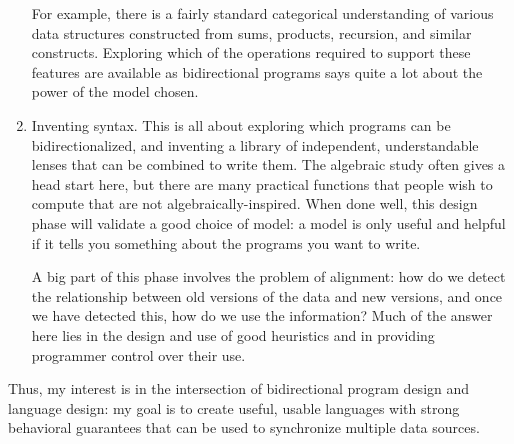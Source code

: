 \documentclass{article}
\begin{document}
\begin{enumerate}
        For example, there is a fairly standard categorical understanding of
        various data structures constructed from sums, products, recursion,
        and similar constructs. Exploring which of the operations required
        to support these features are available as bidirectional programs
        says quite a lot about the power of the model chosen.
    \item Inventing syntax. This is all about exploring which programs can
        be bidirectionalized, and inventing a library of independent,
        understandable lenses that can be combined to write them. The
        algebraic study often gives a head start here, but there are many
        practical functions that people wish to compute that are not
        algebraically-inspired. When done well, this design phase will
        validate a good choice of model: a model is only useful and helpful
        if it tells you something about the programs you want to write.

        A big part of this phase involves the problem of alignment: how do
        we detect the relationship between old versions of the data and new
        versions, and once we have detected this, how do we use the
        information? Much of the answer here lies in the design and use of
        good heuristics and in providing programmer control over their use.
\end{enumerate}

Thus, my interest is in the intersection of bidirectional program design and
language design: my goal is to create useful, usable languages with strong
behavioral guarantees that can be used to synchronize multiple data sources.
\end{document}
